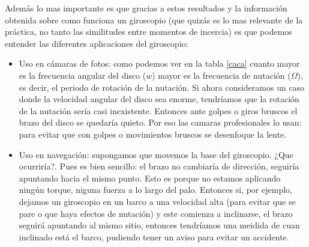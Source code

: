 \documentclass[12pt,a4paper]{article}
\begin{document}
Además lo mas importante es que gracias a estos resultados y la información obtenida sobre como funciona un giroscopio (que quizás es lo mas relevante de la práctica, no tanto las similitudes entre momentos de incercia) es que podemos entender las diferentes aplicaciones del giroscopio: 

\begin{itemize}
\item Uso en cámaras de fotos: como podemos ver en la tabla \ref{caca} cuanto mayor es la frecuencia angular del disco ($w$) mayor es la frecuencia de nutación ($\Omega$), es decir, el periodo de rotación de la nutación. Si ahora consideramos un caso donde la velocidad angular del disco sea enorme, tendríamos que la rotación de la nutación sería casi inexistente. Entonces ante golpes o giros bruscos el brazo del disco se quedaría quieto. Por eso las camaras profesionales lo usan: para evitar que con golpes o movimientos bruscos se desenfoque la lente.

\item Uso en navegación: supongamos que movemos la base del giroscopio. ¿Que ocurriría?. Pues es bien sencillo: el brazo no cambiaría de dirección, seguiría apuntando hacia el mismo punto. Esto es porque no estamos aplicando ningún torque, niguna fuerza a lo largo del palo. Entonces si, por ejemplo, dejamos un giroscopio en un barco a una velocidad alta (para evitar que se pare o que haya efectos de nutación) y este comienza a inclinarse, el brazo seguirá apuntando al mismo sitio, entonces tendríamos una meidida de cuan inclinado está el barco, pudiendo tener un aviso para evitar un accidente. 
\end{itemize}
\end{document}
